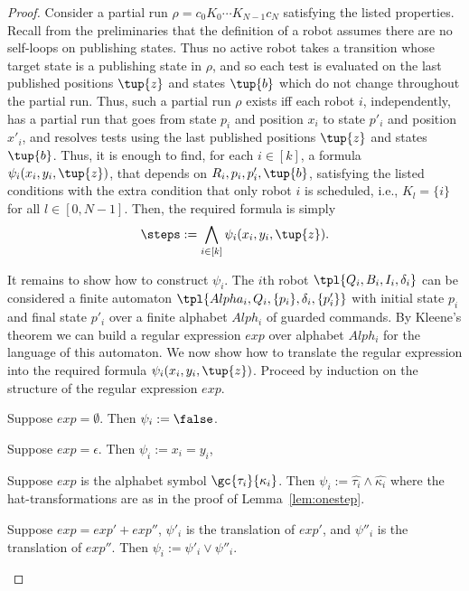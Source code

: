 \begin{proof}
Consider a partial run $\rho = c_0K_0 \cdots K_{N-1}c_N$ satisfying the listed properties. Recall from the preliminaries that the definition of a robot assumes there are no self-loops on publishing states.
Thus no active robot takes a transition whose target state is a publishing state in $\rho$, and so each test is evaluated on the last published 
positions $\tup{z}$ and states $\tup{b}$ which do not change throughout the partial run. Thus, such a partial run $\rho$ exists iff each robot $i$, independently, has a partial run that goes from state $p_i$ and position $x_i$ to state $p'_i$ and position $x'_i$, and resolves tests using the last published positions $\tup{z}$ and states $\tup{b}$.  
Thus, it is enough to find, for each $i \in [k]$, a formula $\psi_{i}(x_i,y_i,\tup{z})$, that depends on $R_i,p_i,p'_i,\tup{b}$, satisfying the listed conditions with the extra condition that only robot $i$ is scheduled, i.e., $K_l = \{i\}$ for all $l \in [0,N-1]$. Then, the required formula is simply 
\[ 
\steps := \bigwedge_{i \in [k]} \psi_i(x_i,y_i,\tup{z}).
\]

It remains to show how to construct $\psi_i$. 
The $i$th robot $\tpl{Q_i,B_i,I_i,\delta_i}$ 
can be considered a finite automaton $\tpl{Alpha_i,Q_i,\{p_i\},\delta_i,\{p'_i\}}$ with initial state $p_i$ and final state 
$p'_i$ over a finite alphabet $Alph_i$ of guarded commands. By Kleene's theorem we can build a regular expression $exp$ over alphabet $Alph_i$ for the language of this automaton. We now show how to translate the regular expression into the required \msol formula $\psi_i(x_i,y_i,\tup{z})$.
Proceed by induction on the structure of the regular expression $exp$.

\begin{itemize}

\- Suppose $exp = \emptyset$. Then $\psi_i := \false$.

\- Suppose $exp = \epsilon$. Then $\psi_i := x_i = y_i$,

\- Suppose $exp$ is the alphabet symbol $\gc{\tau_i}{\kappa_i}$. Then $\psi_i := \hat{\tau_i} \wedge \hat{\kappa_i}$ where the hat-transformations are
as in the proof of Lemma~\ref{lem:onestep}.
                


\- Suppose $exp = exp' +  exp''$, $\psi'_i$ is the translation of $exp'$, and $\psi''_i$ is the translation of $exp''$. Then 
$\psi_i := \psi'_i \vee \psi''_i$.


\end{itemize}
\end{proof}
